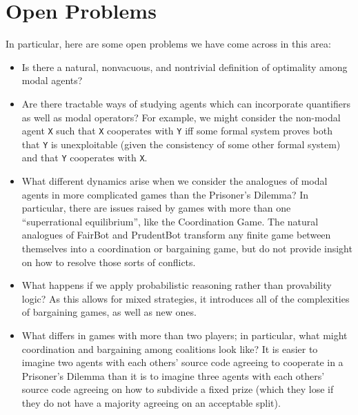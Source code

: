 \documentclass[12pt, letterpaper]{article}
\numberwithin{equation}{section}
\begin{document}
\section{Open Problems}
\label{OpenProblems}
In particular, here are some open problems we have come across in this area:
\begin{itemize}
\item Is there a natural, nonvacuous, and nontrivial definition of optimality among modal agents?
\item Are there tractable ways of studying agents which can incorporate quantifiers as well as modal operators? For example, we might consider the non-modal agent \texttt{X} such that \texttt{X} cooperates with \texttt{Y} iff some formal system proves both that \texttt{Y} is unexploitable (given the consistency of some other formal system) and that \texttt{Y} cooperates with \texttt{X}.
\item What different dynamics arise when we consider the analogues of modal agents in more complicated games than the Prisoner's Dilemma? In particular, there are issues raised by games with more than one ``superrational equilibrium'', like the Coordination Game. The natural analogues of FairBot and PrudentBot transform any finite game between themselves into a coordination or bargaining game, but do not provide insight on how to resolve those sorts of conflicts.
\item What happens if we apply probabilistic reasoning rather than provability logic? As this allows for mixed strategies, it introduces all of the complexities of bargaining games, as well as new ones. %
\item What differs in games with more than two players; in particular, what might coordination and bargaining among coalitions look like? It is easier to imagine two agents with each others' source code agreeing to cooperate in a Prisoner's Dilemma than it is to imagine three agents with each others' source code agreeing on how to subdivide a fixed prize (which they lose if they do not have a majority agreeing on an acceptable split).
\end{itemize}
\end{document}
